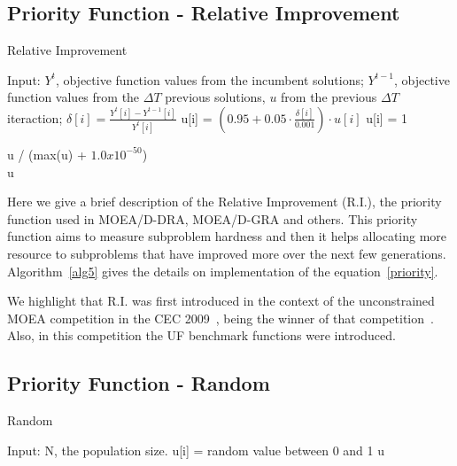 \subsection{Priority Function - Relative Improvement}  

\begin{algorithm}[t]
	\caption{Relative Improvement}\label{alg5}
	\begin{algorithmic}[1]
		
		\State Input:   $Y^t$, objective function values from the incumbent solutions; $Y^{t-1}$, objective function values from the $\Delta T$ previous solutions, $u$ from the previous $\Delta T$ iteraction;
		\State $\delta[i] = \frac{Y^t[i] - Y^{t-1}[i]}{Y^t[i]}$
		\State u[i] = $(0.95 + 0.05 \cdot \frac{\delta[i]}{0.001}) \cdot u[i]$
		\Else 
		\State u[i] = 1
		\EndIf
		
		
		\EndFor
		
		\State u / (max(u) + $1.0 x 10^{-50}$)\\
		\Return u
	\end{algorithmic}
\end{algorithm}

Here we give a brief description of the Relative Improvement (R.I.), the priority function used in MOEA/D-DRA, MOEA/D-GRA and others. This priority function aims to measure subproblem hardness and then it helps allocating more resource to subproblems that have  improved more over the next few generations. Algorithm~\ref{alg5} gives the details on implementation of the equation~\ref{priority}. 

We highlight that R.I. was first introduced in the context of the unconstrained MOEA competition in the CEC 2009~\cite{zhang2009performance}, being the winner of that competition~\cite{zhang2008multiobjective}. Also, in this competition the UF benchmark functions were introduced.

\subsection{Priority Function - Random}

\begin{algorithm}[t]
	\caption{Random}\label{alg4}
	\begin{algorithmic}[1]
		
		\State Input:  N, the population size.
		\For {i=1 to N}
		\State u[i] = random value between 0 and 1
		\EndFor
		\Return u
	\end{algorithmic}
\end{algorithm}

